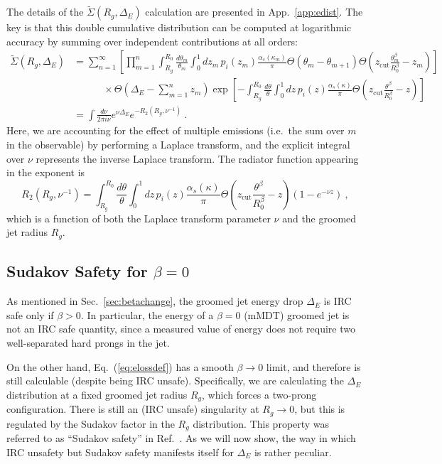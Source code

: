\documentclass[letterpaper,11pt]{article}
\DeclareRobustCommand{\Sec}[1]{Sec.~\ref{#1}}
\DeclareRobustCommand{\App}[1]{App.~\ref{#1}}
\DeclareRobustCommand{\Eq}[1]{Eq.~(\ref{#1})}
\DeclareRobustCommand{\Ref}[1]{Ref.~\cite{#1}}
\begin{document}
The details of the $\widetilde{\Sigma}(R_g,\Delta_E)$ calculation are presented in \App{app:edist}.  The key is that this double cumulative distribution can be computed at logarithmic accuracy by summing over independent contributions at all orders:
\begin{align}
\widetilde{\Sigma}(R_g,\Delta_E)&=\sum_{n=1}^\infty \left[  \prod_{m=1}^n \int_{R_g}^{R_0} \frac{d\theta_m}{\theta_m} \int_0^1 dz_m \, p_i(z_m) \frac{\alpha_s(\kappa_{m})}{\pi} \Theta(\theta_m-\theta_{m+1})  \Theta\left( z_\text{cut}\frac{\theta_m^\beta}{R_0^\beta}-z_m  \right)\right]
\nonumber \\
&\qquad\quad
\times\Theta\left( \Delta_E - \sum_{m=1}^n z_m \right)\exp\left[-\int_{R_g}^{R_0}\frac{d\theta}{\theta} \int_0^1 dz\, p_i(z) \frac{\alpha_s(\kappa)}{\pi} \Theta\left( z_\text{cut}\frac{\theta^\beta}{R_0^\beta}-z  \right) \right] \nonumber \\
&=\int \frac{d\nu}{2\pi i \nu}e^{\nu \Delta_E}  e^{-R_2\left(R_g,\nu^{-1}\right)} \ .
\end{align}
Here, we are accounting for the effect of multiple emissions (i.e.\ the sum over $m$ in the observable) by performing a Laplace transform, and the explicit integral over $\nu$ represents the inverse Laplace transform.  
The radiator function appearing in the exponent is 
\begin{equation}\label{eq:elossrad}
R_2\left(R_g,\nu^{-1}\right)=\int_{R_g}^{R_0}\frac{d\theta}{\theta} \int_0^1 dz\, p_i(z) \frac{\alpha_s(\kappa)}{\pi}\Theta\left( z_\text{cut}\frac{\theta^\beta}{R_0^\beta}-z  \right)\left( 1- e^{-\nu z}  \right) \ ,
\end{equation}
which is a function of both the Laplace transform parameter $\nu$ and the groomed jet radius $R_g$.

\subsection{Sudakov Safety for $\beta=0$}
\label{sec:sdkv}

As mentioned in \Sec{sec:betachange}, the groomed jet energy drop $\Delta_E$ is IRC safe only if $\beta>0$.  In particular, the energy of a $\beta = 0$ (mMDT) groomed jet is not an IRC safe quantity, since a measured value of energy does not require two well-separated hard prongs in the jet.

On the other hand, \Eq{eq:elossdef} has a smooth $\beta \to 0$ limit, and therefore is still calculable (despite being IRC unsafe).  Specifically, we are calculating the $\Delta_E$ distribution at a fixed groomed jet radius $R_g$, which forces a two-prong configuration.  There is still an (IRC unsafe) singularity at $R_g \to 0$, but this is regulated by the Sudakov factor in the $R_g$ distribution.  This property was referred to as ``Sudakov safety'' in \Ref{Larkoski:2013paa}.  As we will now show, the way in which IRC unsafety but Sudakov safety manifests itself for $\Delta_E$ is rather peculiar.
\end{document}
